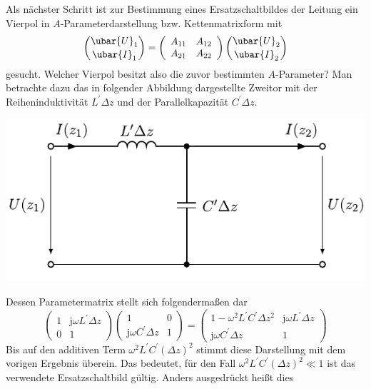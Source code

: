 Als nächster Schritt ist zur Bestimmung eines Ersatzschaltbildes der Leitung ein Vierpol in $A$-Parameterdarstellung bzw. Kettenmatrixform mit
\begin{equation}
\binom{\ubar{U}_{1}}{\ubar{I}_{1}}=\left(\begin{array}{ll}
	A_{11} & A_{12}  \\
	A_{21} & A_{22}
\end{array}\right)\binom{\ubar{U}_{2}}{\ubar{I}_{2}}
\end{equation}
gesucht. Welcher Vierpol besitzt also die zuvor bestimmten $A$-Parameter? Man betrachte dazu das in folgender Abbildung dargestellte Zweitor mit der Reiheninduktivität $L^{\prime} \Delta z$ und der Parallelkapazität $C^{\prime} \Delta z$.
\begin{center}
	\includegraphics{res/LT3}
\end{center}
Dessen Parametermatrix stellt sich folgendermaßen dar
\begin{equation}
\left(\begin{array}{cc}
	1 & \mathrm{j} \omega L^{\prime} \Delta z  \\
	0 & 1
\end{array}\right)\left(\begin{array}{cc}
	1 & 0 \\
	\mathrm{j} \omega C^{\prime} \Delta z & 1
\end{array}\right)=\left(\begin{array}{cc}
	1-\omega^{2} L^{\prime} C^{\prime} \Delta z^{2} & \mathrm{j} \omega L^{\prime} \Delta z \\
	\mathrm{j} \omega C^{\prime} \Delta z & 1
\end{array}\right)
\end{equation}
Bis auf den additiven Term $\omega^{2} L^{\prime} C^{\prime}(\Delta z)^{2}$ stimmt diese Darstellung mit dem vorigen Ergebnis überein. Das bedeutet, für den Fall $\omega^{2} L^{\prime} C^{\prime}(\Delta z)^{2} \ll 1$ ist das verwendete Ersatzschaltbild gültig. Anders ausgedrückt heißt dies

